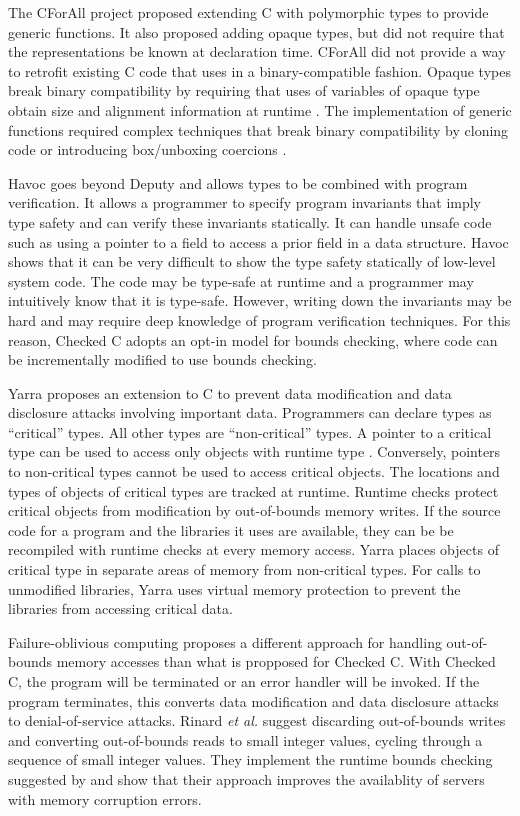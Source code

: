 The CForAll project \cite{Ditchfield1994} proposed extending
C with polymorphic types to provide generic functions.  It also proposed 
adding opaque types, but did not require that the representations be known at declaration time.
CForAll did not provide a way to retrofit existing C code that uses 
\uncheckedptrvoid{} in a binary-compatible fashion.  Opaque types break binary
compatibility by requiring that uses of variables of opaque type obtain size and alignment information
at runtime \cite[page 97]{Ditchfield1994}.  The implementation of generic functions required complex techniques
that break binary compatibility by cloning code or introducing box/unboxing coercions \cite{Bilson2003}.

Havoc \cite{Condit2009} goes beyond Deputy and allows types to be combined with program
verification. It allows a programmer to specify program invariants that
imply type safety and can verify these invariants statically. It can
handle unsafe code such as using a pointer to a field to access a prior
field in a data structure.    Havoc shows that it can be very difficult
to show the type safety statically of  low-level system code. 
The code may be type-safe at runtime and a programmer may intuitively know that it is type-safe.  However, writing down the invariants may be hard and may require deep
knowledge of program verification techniques. For this reason,
Checked C adopts an opt-in model for bounds checking, where code
can be incrementally modified to use bounds checking.

Yarra \cite{Schlesinger2011} proposes an extension to C to prevent data
modification and data disclosure attacks involving important data. 
Programmers can declare types as ``critical'' types.  All other types
are ``non-critical'' types.  A pointer to a critical type  can 
be used to access only objects with runtime type .   Conversely, pointers
to non-critical types cannot be used to access critical objects. 
The locations and types of objects of critical types are 
tracked at runtime.  Runtime checks protect critical objects from modification
by out-of-bounds memory writes.  If the source code for a program and the libraries
it uses are available, they can be be recompiled with runtime checks at every memory
access.  Yarra places objects of critical type in separate areas of memory from
non-critical types. For calls to unmodified libraries, Yarra uses virtual memory
protection to prevent the libraries from accessing critical data.

Failure-oblivious computing \cite{Rinard2004} proposes a different approach for
handling out-of-bounds memory accesses than what is propposed for Checked C.  
With Checked C,
the program will be terminated or an error handler will be invoked.  If the
program terminates, this converts data modification and data disclosure attacks to denial-of-service attacks.  Rinard {\it et al.} suggest discarding out-of-bounds
writes and converting out-of-bounds reads to small integer values, cycling
through a sequence of small integer values.   They implement the runtime
bounds checking suggested by \cite{Ruwase2004} and show that their approach
improves the availablity of servers with memory corruption errors.

